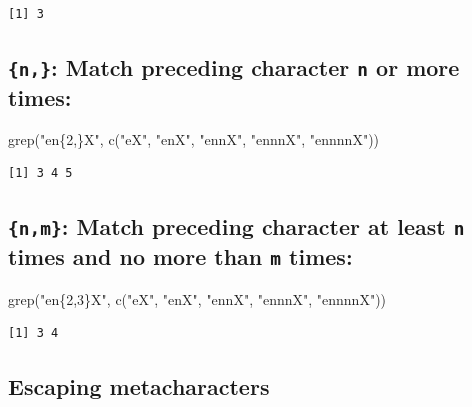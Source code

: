 \documentclass[
]{book}
\newenvironment{Shaded}{\begin{snugshade}}{\end{snugshade}}
\newcommand{\FunctionTok}[1]{\textcolor[rgb]{0.00,0.00,0.00}{#1}}
\newcommand{\NormalTok}[1]{#1}
\newcommand{\StringTok}[1]{\textcolor[rgb]{0.31,0.60,0.02}{#1}}
\begin{document}
\begin{verbatim}
[1] 3
\end{verbatim}

\hypertarget{n-match-preceding-character-n-or-more-times}{%
\subsection{\texorpdfstring{\texttt{\{n,\}}: Match preceding character \texttt{n} or more times:}{\{n,\}: Match preceding character n or more times:}}\label{n-match-preceding-character-n-or-more-times}}

\begin{Shaded}
\begin{Highlighting}[]
\FunctionTok{grep}\NormalTok{(}\StringTok{"en\{2,\}X"}\NormalTok{, }\FunctionTok{c}\NormalTok{(}\StringTok{"eX"}\NormalTok{, }\StringTok{"enX"}\NormalTok{, }\StringTok{"ennX"}\NormalTok{, }\StringTok{"ennnX"}\NormalTok{, }\StringTok{"ennnnX"}\NormalTok{))}
\end{Highlighting}
\end{Shaded}

\begin{verbatim}
[1] 3 4 5
\end{verbatim}

\hypertarget{nm-match-preceding-character-at-least-n-times-and-no-more-than-m-times}{%
\subsection{\texorpdfstring{\texttt{\{n,m\}}: Match preceding character at least \texttt{n} times and no more than \texttt{m} times:}{\{n,m\}: Match preceding character at least n times and no more than m times:}}\label{nm-match-preceding-character-at-least-n-times-and-no-more-than-m-times}}

\begin{Shaded}
\begin{Highlighting}[]
\FunctionTok{grep}\NormalTok{(}\StringTok{"en\{2,3\}X"}\NormalTok{, }\FunctionTok{c}\NormalTok{(}\StringTok{"eX"}\NormalTok{, }\StringTok{"enX"}\NormalTok{, }\StringTok{"ennX"}\NormalTok{, }\StringTok{"ennnX"}\NormalTok{, }\StringTok{"ennnnX"}\NormalTok{))}
\end{Highlighting}
\end{Shaded}

\begin{verbatim}
[1] 3 4
\end{verbatim}

\hypertarget{escaping-metacharacters}{%
\subsection{Escaping metacharacters}\label{escaping-metacharacters}}
\end{document}
